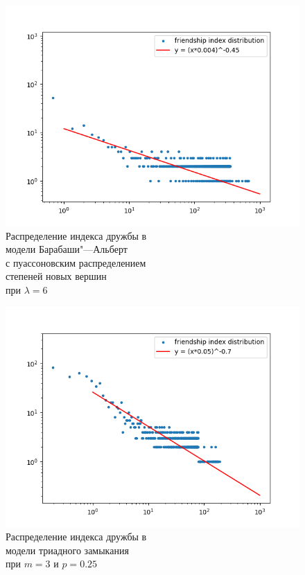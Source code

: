 \documentclass[bachelor, och, diploma]{SCWorks}
\begin{document}
\begin{figure}[!ht]
    \centering
    \includegraphics[scale=0.5]{diploma_results/static_log/bap_dist_beta_6.png}
        \caption{Распределение индекса дружбы  в\\ модели Барабаши"---Альберт\\ с пуассоновским распределением\\ степеней новых вершин \\ при $\lambda=6$}
\end{figure}
\begin{figure}[!ht]
    \centering
    \includegraphics[scale=0.5]{diploma_results/static_log/triad_dist_beta_3_0.25.png}
    \caption{Распределение индекса дружбы  в\\ модели триадного замыкания\\ при $m=3$ и $p=0.25$}
\end{figure}
\end{document}
